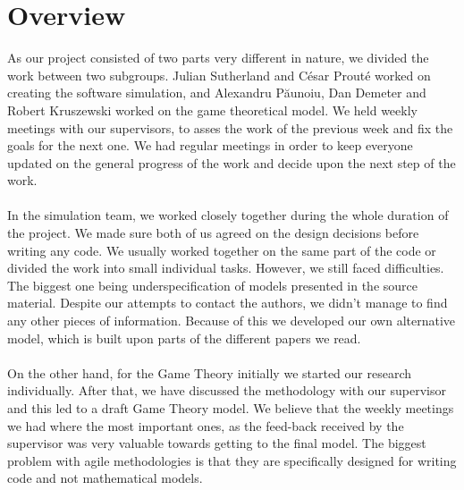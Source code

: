 \documentclass[10pt, a4paper]{report}
\begin{document}
\section{Overview}\label{sec:pmoverview}
As our project consisted of two parts very different in nature, we divided the work between two subgroups. Julian Sutherland and C\'{e}sar Prout\'{e} worked on creating the software simulation, and Alexandru P\u{a}unoiu, Dan Demeter and Robert Kruszewski worked on the game theoretical model. We held weekly meetings with our supervisors, to asses the work of the previous week and fix the goals for the next one. We had regular meetings in order to keep everyone updated on the general progress of the work and decide upon the next step of the work.
\\\\
In the simulation team, we worked closely together during the whole duration of the project. We made sure both of us agreed on the design decisions before writing any code. We usually worked together on the same part of the code or divided the work into small individual tasks. However, we still faced difficulties. The biggest one being underspecification of models presented in the source material. Despite our attempts to contact the authors, we didn't manage to find any other pieces of information. Because of this we developed our own alternative model, which is built upon parts of the different papers we read.
\\\\
On the other hand, for the Game Theory initially we started our research individually. After that, we have discussed the methodology with our supervisor and this led to a draft Game Theory model. We believe that the weekly meetings we had where the most important ones, as the feed-back received by the supervisor was very valuable towards getting to the final model. The biggest problem with agile methodologies is that they are specifically designed for writing code and not mathematical models. 
%
%
%
                                                                                                                                                                                                                                                                                                                                                                     
\end{document}
